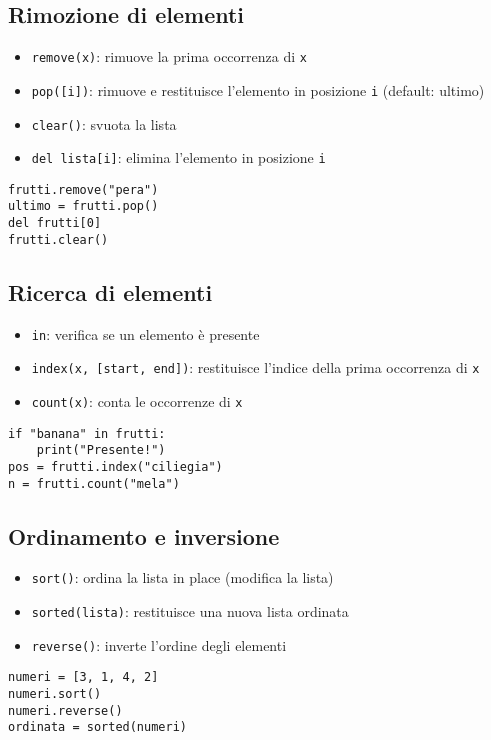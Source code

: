 \documentclass[a4paper,12pt]{article}
\begin{document}
\subsection*{Rimozione di elementi}
\begin{itemize}
    \item \texttt{remove(x)}: rimuove la prima occorrenza di \texttt{x}
    \item \texttt{pop([i])}: rimuove e restituisce l'elemento in posizione \texttt{i} (default: ultimo)
    \item \texttt{clear()}: svuota la lista
    \item \texttt{del lista[i]}: elimina l'elemento in posizione \texttt{i}
\end{itemize}
\begin{lstlisting}
frutti.remove("pera")
ultimo = frutti.pop()
del frutti[0]
frutti.clear()
\end{lstlisting}

\subsection*{Ricerca di elementi}
\begin{itemize}
    \item \texttt{in}: verifica se un elemento è presente
    \item \texttt{index(x, [start, end])}: restituisce l'indice della prima occorrenza di \texttt{x}
    \item \texttt{count(x)}: conta le occorrenze di \texttt{x}
\end{itemize}
\begin{lstlisting}
if "banana" in frutti:
    print("Presente!")
pos = frutti.index("ciliegia")
n = frutti.count("mela")
\end{lstlisting}

\subsection*{Ordinamento e inversione}
\begin{itemize}
    \item \texttt{sort()}: ordina la lista in place (modifica la lista)
    \item \texttt{sorted(lista)}: restituisce una nuova lista ordinata
    \item \texttt{reverse()}: inverte l'ordine degli elementi
\end{itemize}
\begin{lstlisting}
numeri = [3, 1, 4, 2]
numeri.sort()
numeri.reverse()
ordinata = sorted(numeri)
\end{lstlisting}
\end{document}
